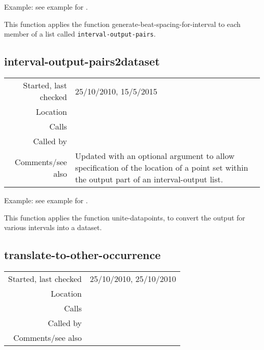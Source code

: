 \vspace{0.5cm}
\noindent Example: see example for
.
\vspace{0.5cm}

\noindent This function applies the function
generate-beat-spacing-for-interval to each member of
a list called \texttt{interval-output-pairs}.


\subsection*{interval-output-pairs2dataset}\label{fun:interval-output-pairs2dataset}

\vspace{0.3cm}
\begin{tabular}{r|p{8cm}}
Started, last checked & 25/10/2010, 15/5/2015 \\
Location & \nameref{sec:generating-with-patterns} \\
Calls & \nameref{fun:unite-datapoints} \\
Called by & \nameref{fun:generate-beat-spacing<->pattern-inheritance} \\
Comments/see also & Updated with an optional argument to allow specification of the location of a point set within the output part of an interval-output list. 
\end{tabular}

\vspace{0.5cm}
\noindent Example: see example for
.
\vspace{0.5cm}

\noindent This function applies the function
unite-datapoints, to convert the output for various
intervals into a dataset.


\subsection*{translate-to-other-occurrence}\label{fun:translate-to-other-occurrence}

\vspace{0.3cm}
\begin{tabular}{r|p{8cm}}
Started, last checked & 25/10/2010, 25/10/2010 \\
Location & \nameref{sec:generating-with-patterns} \\
Calls & \nameref{fun:translation} \\
Called by & \nameref{fun:translate-to-other-occurrences} \\
Comments/see also &
\end{tabular}

